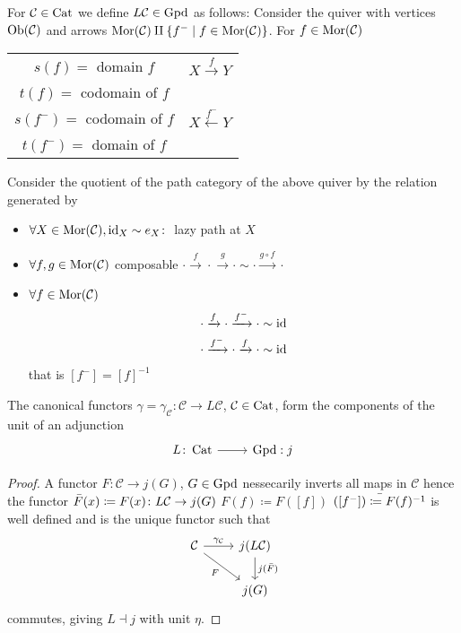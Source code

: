 For $\mathcal{C} \in \operatorname{Cat}$ we define $L\mathcal{C} \in \operatorname{Gpd}$ as follows:
Consider the quiver with vertices $\operatorname{Ob}(\mathcal{C})$ and arrows $\operatorname{Mor}(\mathcal{C}) \amalg \{ f^{-} \mid f \in \operatorname{Mor}(\mathcal{C}) \}$.
For $f \in \operatorname{Mor}(\mathcal{C})$
\begin{center}
\begin{tabular}{cc}
    $s(f)=$ domain $f$ & $X \xrightarrow{f} Y$  
    \\
    $t(f)=$ codomain of $f$ &
    \\
    $s(f^{-})=$ codomain of $f$ & $X \xleftarrow{f^{-}}Y$
    \\
    $t(f^{-})=$ domain of $f$
\end{tabular}
\end{center}

Consider the quotient of the path category of the above quiver by the relation generated by 
\begin{itemize}
    \item 
    $\forall X \in \operatorname{Mor}(\mathcal{C}), \operatorname{id}_X \sim e_X\colon $ lazy path at $X$
    \item 
    $\forall f,g \in \operatorname{Mor}(\mathcal{C})$ composable $\cdot \xrightarrow{f} \cdot \xrightarrow{g} \cdot \sim \cdot \xrightarrow{g \circ f} \cdot$
    \item 
    $\forall f \in \operatorname{Mor}(\mathcal{C})$
    \begin{align*}
        \cdot \xrightarrow{f} \cdot \xrightarrow{f^-} \cdot \sim \operatorname{id}
        \\
        \cdot \xrightarrow{f^-} \cdot \xrightarrow{f} \cdot \sim \operatorname{id}
    \end{align*}
    that is $[f^-]=[f]^{-1}$
\end{itemize}

\begin{thm}
    The canonical functors $\gamma = \gamma_{\mathcal{C}}\colon \mathcal{C} \to L \mathcal{C}$, $\mathcal{C} \in \operatorname{Cat}$, form the components of the unit of an adjunction
    \[
    \begin{tikzcd}
        L\colon \Cat
        \ar[r]
        &
        \Gpd:j
    \end{tikzcd}
    \]
\end{thm}

\begin{proof}
    A functor $F \colon \mathcal{C} \to j(G)$, $G \in \operatorname{Gpd}$ nessecarily inverts all maps in $\mathcal{C}$ hence the functor $\Bar{F}(x) \coloneqq F(x)\colon L\mathcal{C} \to j(G)$ $F(f) \coloneqq F([f])$ $\Bar{([f^-])\coloneqq F(f)^{-1}}$ is well defined and is the unique functor such that 
    \[
    \begin{tikzcd}
        \mathcal{C} 
        \ar[r, "\gamma_{\mathcal{C}}"]
        \ar[dr, "F"']
        &
        j(L\mathcal{C})
        \ar[d, "j(\Bar{F})"]
        \\
        &
        j(G)
    \end{tikzcd}
    \]
    commutes, giving $L \dashv j$ with unit $\eta$.
\end{proof}

